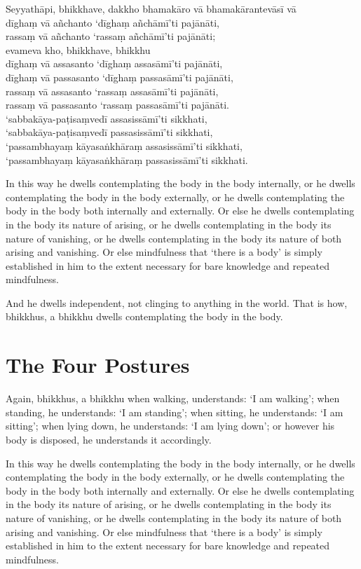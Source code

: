 Seyyathāpi, bhikkhave, dakkho bhamakāro vā bhamakārantevāsī vā\\
dīghaṃ vā añchanto ‘dīghaṃ añchāmī’ti pajānāti,\\
rassaṃ vā añchanto ‘rassaṃ añchāmī’ti pajānāti;\\
evameva kho, bhikkhave, bhikkhu\\
dīghaṃ vā assasanto ‘dīghaṃ assasāmī’ti pajānāti,\\
dīghaṃ vā passasanto ‘dīghaṃ passasāmī’ti pajānāti,\\
rassaṃ vā assasanto ‘rassaṃ assasāmī’ti pajānāti,\\
rassaṃ vā passasanto ‘rassaṃ passasāmī’ti pajānāti.\\
‘sabbakāya-paṭisaṃvedī assasissāmī’ti sikkhati,\\
‘sabbakāya-paṭisaṃvedī passasissāmī’ti sikkhati,\\
‘passambhayaṃ kāyasaṅkhāraṃ assasissāmī’ti sikkhati,\\
‘passambhayaṃ kāyasaṅkhāraṃ passasissāmī’ti sikkhati.

\englishPage

In this way he dwells contemplating the body in the body internally, or he
dwells contemplating the body in the body externally, or he dwells contemplating
the body in the body both internally and externally. Or else he dwells
contemplating in the body its nature of arising, or he dwells contemplating in
the body its nature of vanishing, or he dwells contemplating in the body its
nature of both arising and vanishing. Or else mindfulness that ‘there is a body’
is simply established in him to the extent necessary for bare knowledge and
repeated mindfulness.

And he dwells independent, not clinging to anything in the world. That is how,
bhikkhus, a bhikkhu dwells contemplating the body in the body.


\section{The Four Postures}

Again, bhikkhus, a bhikkhu when walking, understands: ‘I am walking’; when
standing, he understands: ‘I am standing’; when sitting, he understands: ‘I am
sitting’; when lying down, he understands: ‘I am lying down’; or however his
body is disposed, he understands it accordingly.

In this way he dwells contemplating the body in the body internally, or he
dwells contemplating the body in the body externally, or he dwells contemplating
the body in the body both internally and externally. Or else he dwells
contemplating in the body its nature of arising, or he dwells contemplating in
the body its nature of vanishing, or he dwells contemplating in the body its
nature of both arising and vanishing. Or else mindfulness that ‘there is a body’
is simply established in him to the extent necessary for bare knowledge and
repeated mindfulness.

